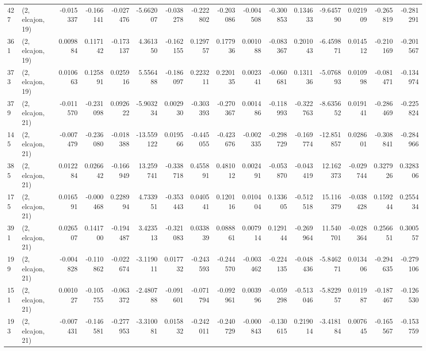 \begin{tabular}{llrrrrrrrrrrrrrr}
427 &  (2, elcajon, 19) &  -0.015337 & -0.166141 & -0.027476 &   -5.662007 & -0.038278 &  -0.222802 & -0.203086 & -0.004508 & -0.300853 &  0.134633 &   -9.645790 &  0.021909 & -0.265819 & -0.281291 \\
361 &  (2, elcajon, 19) &   0.009884 &  0.117142 & -0.173137 &    4.361350 & -0.162155 &   0.129757 &  0.177936 &  0.001088 & -0.083367 &  0.201043 &   -6.459871 &  0.014512 & -0.210169 & -0.201567 \\
373 &  (2, elcajon, 19) &   0.010663 &  0.125891 &  0.025916 &    5.556488 & -0.186097 &   0.223211 &  0.220135 &  0.002341 & -0.060681 &  0.131136 &   -5.076893 &  0.010998 & -0.081471 & -0.134974 \\
379 &  (2, elcajon, 21) &  -0.011570 & -0.231098 &  0.092622 &   -5.903234 &  0.002930 &  -0.303393 & -0.270367 &  0.001486 & -0.118993 & -0.322763 &   -8.635652 &  0.019141 & -0.286469 & -0.225824 \\
145 &  (2, elcajon, 21) &  -0.007479 & -0.236080 & -0.018388 &  -13.559122 &  0.019566 &  -0.445055 & -0.423676 & -0.002335 & -0.298729 & -0.169774 &  -12.851857 &  0.028601 & -0.308841 & -0.284966 \\
385 &  (2, elcajon, 21) &   0.012284 &  0.026642 & -0.166949 &   13.259741 & -0.338718 &   0.455891 &  0.481012 &  0.002491 & -0.053870 & -0.043419 &   12.162373 & -0.029744 &  0.327926 &  0.328306 \\
175 &  (2, elcajon, 21) &   0.016591 & -0.000468 &  0.228994 &    4.733951 & -0.353443 &   0.040541 &  0.120116 &  0.010404 &  0.133605 & -0.512518 &   15.116379 & -0.038428 &  0.159244 &  0.255434 \\
391 &  (2, elcajon, 21) &   0.026507 &  0.141700 & -0.194487 &    3.423513 & -0.321083 &   0.033839 &  0.088861 &  0.007914 &  0.129144 & -0.269964 &   11.540701 & -0.028364 &  0.256651 &  0.300557 \\
199 &  (2, elcajon, 21) &  -0.004828 & -0.110862 & -0.022674 &   -3.119011 &  0.017732 &  -0.243593 & -0.244570 & -0.003462 & -0.224135 & -0.048436 &   -5.846271 &  0.013406 & -0.294635 & -0.279106 \\
151 &  (2, elcajon, 21) &   0.001027 & -0.105755 & -0.063372 &   -2.480788 & -0.091601 &  -0.071794 & -0.092961 &  0.003996 & -0.059298 & -0.513046 &   -5.822957 &  0.011987 & -0.187467 & -0.126530 \\
193 &  (2, elcajon, 21) &  -0.007431 & -0.146581 & -0.277953 &   -3.310081 &  0.015832 &  -0.242011 & -0.240729 & -0.000843 & -0.130615 &  0.219014 &   -3.418184 &  0.007645 & -0.165567 & -0.153759 \\

\end{tabular}
